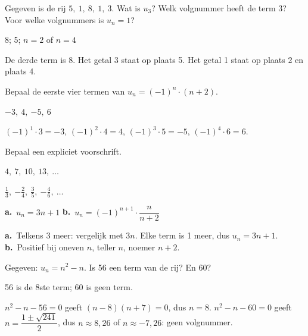 
\begin{oefeningen}
\begin{oefening}[1]\label{oef:h1-t1}
Gegeven is de rij $5,\ 1,\ 8,\ 1,\ 3$. Wat is $u_3$? Welk volgnummer heeft de term 3? Voor welke volgnummers is $u_n = 1$?
\begin{solution}
8; 5; $n=2$ of $n=4$
\end{solution}
\begin{fullsolution}
De derde term is 8. Het getal 3 staat op plaats 5. Het getal 1 staat op plaats 2 en plaats 4.
\end{fullsolution}
\end{oefening}

\begin{oefening}[1]\label{oef:h1-t2}
Bepaal de eerste vier termen van $u_n = (-1)^n \cdot (n+2)$.
\begin{solution}
$-3,\ 4,\ {-5},\ 6$
\end{solution}
\begin{fullsolution}
$(-1)^1\cdot 3=-3$, $(-1)^2\cdot 4=4$, $(-1)^3\cdot 5=-5$, $(-1)^4\cdot 6=6$.
\end{fullsolution}
\end{oefening}

\begin{oefening}[2]\label{oef:h1-t3}
Bepaal een expliciet voorschrift.
\begin{reeks}[2]
  \item $4,\ 7,\ 10,\ 13,\ \ldots$
  \item $\tfrac13,\ {-\tfrac24},\ \tfrac35,\ {-\tfrac46},\ \ldots$
\end{reeks}
\begin{solution}
\textbf{a.}~$u_n=3n+1$ \quad \textbf{b.}~$u_n=(-1)^{n+1}\cdot\dfrac{n}{n+2}$
\end{solution}
\begin{fullsolution}
\textbf{a.}~Telkens 3 meer: vergelijk met $3n$. Elke term is 1 meer, dus $u_n=3n+1$.\\
\textbf{b.}~Positief bij oneven $n$, teller $n$, noemer $n+2$.
\end{fullsolution}
\end{oefening}

\begin{oefening}[1]\label{oef:h1-t4}
Gegeven: $u_n = n^2 - n$. Is 56 een term van de rij? En 60?
\begin{solution}
56 is de 8ste term; 60 is geen term.
\end{solution}
\begin{fullsolution}
$n^2-n-56=0$ geeft $(n-8)(n+7)=0$, dus $n=8$. $n^2-n-60=0$ geeft $n=\dfrac{1\pm\sqrt{241}}{2}$, dus $n\approx 8{,}26$ of $n\approx -7{,}26$: geen volgnummer.
\end{fullsolution}
\end{oefening}


\end{oefeningen}
